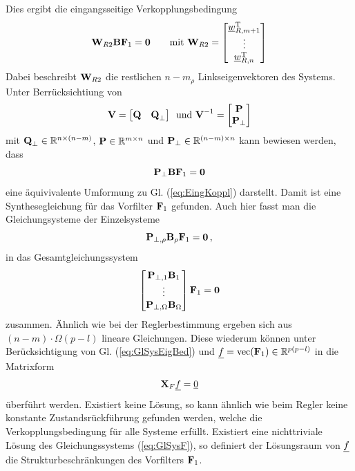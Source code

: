 Dies ergibt die eingangsseitige Verkopplungsbedingung
\begin{equation}\label{eq:EingKoppl}
	\textbf{W}_{R2}\textbf{B}\textbf{F}_1 = \textbf{0} \qquad \textnormal{mit } 
	\textbf{W}_{R2} = \begin{bmatrix}
		\underline{w}^{\textnormal{T}}_{R,m+1} \\
		\vdots \\
		\underline{w}^{\textnormal{T}}_{R,n} 
	\end{bmatrix}
\end{equation}
Dabei beschreibt $\textbf{W}_{R2}$ die restlichen $n-m_\rho$ Linkseigenvektoren des Systems.
Unter Berrücksichtiung von
\begin{equation}
	\textbf{V} = \begin{bmatrix}\textbf{Q} &\textbf{Q}_{\bot}	\end{bmatrix}
	 \, \textnormal{ und } 
	 \textbf{V}^{-1} = \begin{bmatrix}
	 	\textbf{P} \\ \textbf{P}_{\bot}
	 \end{bmatrix}
\end{equation}
mit $\textbf{Q}_{\bot} \in \mathbb{R}^{n\times(n-m)}$, $\textbf{P} \in \mathbb{R}^{m\times n}$ und $\textbf{P}_{\bot} \in \mathbb{R}^{(n-m)\times n}$
kann bewiesen werden, dass
\begin{equation}
	\textbf{P}_{\bot}\textbf{B}\textbf{F}_1 = \textbf{0}
\end{equation}
eine äquivivalente Umformung zu Gl. (\ref{eq:EingKoppl}) darstellt.
Damit ist eine Synthesegleichung für das Vorfilter $\textbf{F}_1$ gefunden.
Auch hier fasst man die Gleichungsysteme der Einzelsysteme
\begin{equation}
	\textbf{P}_{\bot,\rho}\textbf{B}_{\rho}\textbf{F}_1 = \textbf{0} \, ,
\end{equation}
in das Gesamtgleichungssystem
\begin{equation}\label{eq:GlSysEigBed}
	\begin{bmatrix}
		\textbf{P}_{\bot,1}\textbf{B}_1 \\
		\vdots \\
		\textbf{P}_{\bot,\Omega}\textbf{B}_{\Omega}
	\end{bmatrix} \textbf{F}_1 = \textbf{0}
\end{equation}
zusammen.
Ähnlich wie bei der Reglerbestimmung ergeben sich aus $(n-m)\cdot\Omega(p-l)$ lineare Gleichungen.
Diese wiederum können unter Berücksichtigung von Gl. (\ref{eq:GlSysEigBed}) und $\underline{f} = \textnormal{vec}(\textbf{F}_1) \in \mathbb{R}^{p(p-l)}$ in die Matrixform 
\begin{equation}\label{eq:GlSysF}
	\textbf{X}_F \underline{f} = \underline{0}
\end{equation} 
überführt werden.
Existiert keine Lösung, so kann ähnlich wie beim Regler keine konstante Zustandsrückführung gefunden werden, welche die Verkopplungsbedingung für alle Systeme erfüllt.
Existiert eine nichttriviale Lösung des Gleichungssystems (\ref{eq:GlSysF}), so definiert der Lösungsraum von $\underline{f}$ die Strukturbeschränkungen des Vorfilters $\textbf{F}_1$.\\


